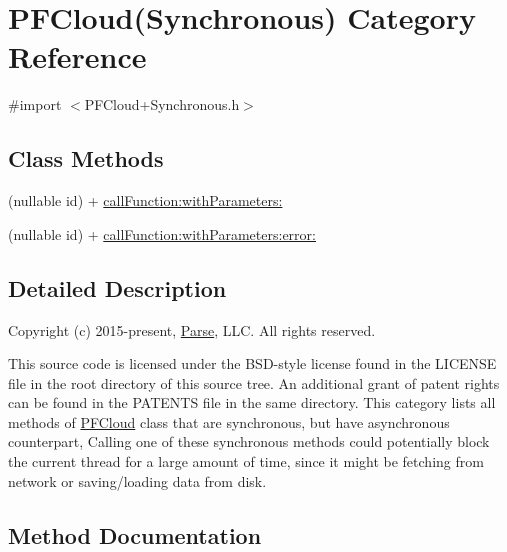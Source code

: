 \hypertarget{category_p_f_cloud_07_synchronous_08}{}\section{P\+F\+Cloud(Synchronous) Category Reference}
\label{category_p_f_cloud_07_synchronous_08}


{\ttfamily \#import $<$P\+F\+Cloud+\+Synchronous.\+h$>$}

\subsection*{Class Methods}
\begin{DoxyCompactItemize}
\item 
(nullable id) + \hyperlink{category_p_f_cloud_07_synchronous_08_a14a5d00feb7ce9dba38888145948a1ed}{call\+Function\+:with\+Parameters\+:}
\item 
(nullable id) + \hyperlink{category_p_f_cloud_07_synchronous_08_a50b8989c8f64013800ec67d3c116c98c}{call\+Function\+:with\+Parameters\+:error\+:}
\end{DoxyCompactItemize}


\subsection{Detailed Description}
Copyright (c) 2015-\/present, \hyperlink{interface_parse}{Parse}, L\+L\+C. All rights reserved.

This source code is licensed under the B\+S\+D-\/style license found in the L\+I\+C\+E\+N\+S\+E file in the root directory of this source tree. An additional grant of patent rights can be found in the P\+A\+T\+E\+N\+T\+S file in the same directory. This category lists all methods of {\ttfamily \hyperlink{interface_p_f_cloud}{P\+F\+Cloud}} class that are synchronous, but have asynchronous counterpart, Calling one of these synchronous methods could potentially block the current thread for a large amount of time, since it might be fetching from network or saving/loading data from disk. 

\subsection{Method Documentation}
\hypertarget{category_p_f_cloud_07_synchronous_08_a14a5d00feb7ce9dba38888145948a1ed}{}
